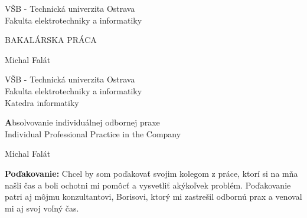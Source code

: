 \documentclass[11pt, oneside]{report}
\def\mfrok{2018}
\def\mfnazov{BAKALÁRSKA PRÁCA}
\def\mfnazovprace{Absolvovanie individuálnej odbornej praxe\\
Individual Professional Practice in the
Company
}
\def\mfautor{Michal Falát}
\begin{document}
  


\thispagestyle{empty}

\begin{center}
\sc\large
VŠB - Technická univerzita Ostrava\\
Fakulta elektrotechniky a informatiky


\vfill

{\LARGE\mfnazov}\\
\end{center}

\vfill

{\sc\large 
\noindent \mfrok \hfill  \hfill \mfautor
}

\eject %


\thispagestyle{empty}
\noindent
\begin{center}
{\LARGE
V\v SB - Technická univerzita Ostrava\\
Fakulta elektrotechniky a informatiky\\
Katedra informatiky\\}

\vfill

{\huge\textbf\mfnazovprace}\\
\end{center}

\vfill



{\LARGE
\noindent \mfrok \hfill  \hfill \mfautor
}

\eject %

\newpage

\newpage 


\newpage 
\setcounter{page}{4}

\vspace*{\fill}
{\bf Poďakovanie:} Chcel by som poďakovať svojim kolegom  z práce, ktorí si na mňa našli čas a boli ochotni mi pomôcť a vysvetliť akýkoľvek problém. Poďakovanie patri aj môjmu konzultantovi, Borisovi, ktorý mi zastrešil odbornú prax a venoval mi aj svoj voľný čas.


\end{document}
